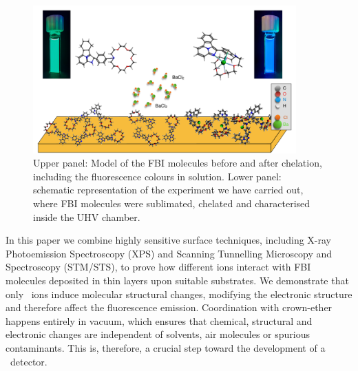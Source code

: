 \documentclass[aps,prl,reprint,longbibliography,superscriptaddress, english]{revtex4-1}
\begin{document}
 \begin{figure}[ht!]
	\includegraphics[width=0.9\textwidth]{figures/fig1_fbi_model.pdf}
	\caption{\label{ModeloFBI} 
    Upper panel: Model of the FBI molecules before and after chelation, including the fluorescence colours in solution. Lower panel: schematic representation of the experiment we have carried out, where FBI molecules were sublimated, chelated and characterised inside the UHV chamber.}
\end{figure}  

In this paper we combine highly sensitive surface techniques, including X-ray Photoemission Spectroscopy (XPS) and Scanning Tunnelling Microscopy and Spectroscopy (STM/STS), to prove how different ions interact with FBI molecules deposited in thin layers upon suitable substrates. We demonstrate that only \Bapp\ ions induce molecular structural changes, modifying the electronic structure and therefore affect the fluorescence emission. Coordination with crown-ether happens entirely in vacuum, which ensures that chemical, structural and electronic changes are independent of solvents, air molecules or spurious contaminants. This is, therefore, a crucial step toward the development of a \Bapp\ detector. 
\end{document}
